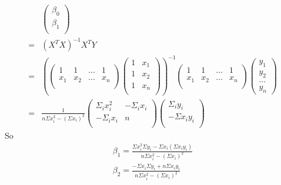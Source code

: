 \documentclass[a4paper]{article}
\begin{document}
\begin{align*}
	&\left(  \begin{array} {c}
		\beta_{0} \\
		\beta_{1} \\
		\end{array}
		\right) \\
=& (X^TX)^{-1}X^TY \\
=&\left( \left(  \begin{array} {cccc}
		1 & 1 &... &1\\
		x_1 & x_2 &... &x_n \\
		\end{array}
		\right) 
    \left(  \begin{array} {cc}
		1 & x_1 \\
		1 & x_2 \\
                   1 & x_n \\
		\end{array}
		\right) 
\right)^{-1}
\left(  \begin{array} {cccc}
		1 & 1 &... &1\\
		x_1 & x_2 &... &x_n \\
		\end{array}
		\right) 
\left(  \begin{array} {c}
		y_1 \\
		y_2 \\
                  ... \\
                  y_n
		\end{array}
		\right) \\
=& \frac{1}{n\Sigma x^2_i - (\Sigma x_i)^2}
\left(  \begin{array} {cc}
	          \Sigma_i x_i^2 & -\Sigma_i x_i \\
		 -\Sigma_i x_i &n\\
		\end{array}
		\right) 
\left(  \begin{array} {c}
	          \Sigma_i y_i \\
		 -\Sigma x_i y_i\\
		\end{array}
		\right) 
\end{align*}
So
\begin{align*}
\beta_1 = \frac{\Sigma x_i^2 \Sigma y_i - \Sigma x_i (\Sigma x_i y_i)}{n\Sigma x^2_i - (\Sigma x_i)^2} \\
\beta_2 = \frac{-\Sigma x_i \Sigma y_i + n \Sigma x_i y_i}{n\Sigma x^2_i - (\Sigma x_i)^2}
\end{align*}
\end{document}
